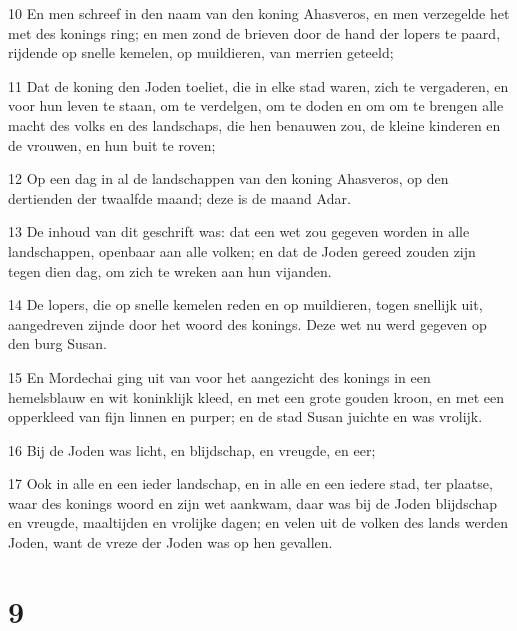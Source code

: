 \par 10 En men schreef in den naam van den koning Ahasveros, en men verzegelde het met des konings ring; en men zond de brieven door de hand der lopers te paard, rijdende op snelle kemelen, op muildieren, van merrien geteeld;
\par 11 Dat de koning den Joden toeliet, die in elke stad waren, zich te vergaderen, en voor hun leven te staan, om te verdelgen, om te doden en om om te brengen alle macht des volks en des landschaps, die hen benauwen zou, de kleine kinderen en de vrouwen, en hun buit te roven;
\par 12 Op een dag in al de landschappen van den koning Ahasveros, op den dertienden der twaalfde maand; deze is de maand Adar.
\par 13 De inhoud van dit geschrift was: dat een wet zou gegeven worden in alle landschappen, openbaar aan alle volken; en dat de Joden gereed zouden zijn tegen dien dag, om zich te wreken aan hun vijanden.
\par 14 De lopers, die op snelle kemelen reden en op muildieren, togen snellijk uit, aangedreven zijnde door het woord des konings. Deze wet nu werd gegeven op den burg Susan.
\par 15 En Mordechai ging uit van voor het aangezicht des konings in een hemelsblauw en wit koninklijk kleed, en met een grote gouden kroon, en met een opperkleed van fijn linnen en purper; en de stad Susan juichte en was vrolijk.
\par 16 Bij de Joden was licht, en blijdschap, en vreugde, en eer;
\par 17 Ook in alle en een ieder landschap, en in alle en een iedere stad, ter plaatse, waar des konings woord en zijn wet aankwam, daar was bij de Joden blijdschap en vreugde, maaltijden en vrolijke dagen; en velen uit de volken des lands werden Joden, want de vreze der Joden was op hen gevallen.

\chapter{9}

